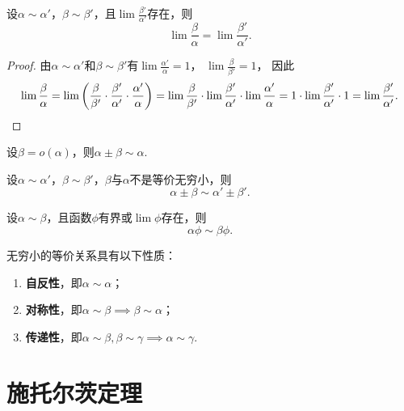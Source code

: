 \begin{theorem}\label{theorem:极限.无穷小的比较2}
设\(\alpha\sim\alpha'\)，\(\beta\sim\beta'\)，且\(\lim\frac{\beta'}{\alpha'}\)存在，则\[
	\lim\frac{\beta}{\alpha}=\lim\frac{\beta'}{\alpha'}.
\]
\begin{proof}
由\(\alpha\sim\alpha'\)和\(\beta\sim\beta'\)有\(\lim\frac{\alpha'}{\alpha} = 1\)，
\(\lim\frac{\beta}{\beta'} = 1\)，
因此\[
	\lim\frac{\beta}{\alpha}
	= \lim \left(
		\frac{\beta}{\beta'}
		\cdot \frac{\beta'}{\alpha'}
		\cdot \frac{\alpha'}{\alpha}
	\right)
	= \lim\frac{\beta}{\beta'}
		\cdot \lim \frac{\beta'}{\alpha'}
		\cdot \lim\frac{\alpha'}{\alpha}
	= 1 \cdot \lim \frac{\beta'}{\alpha'} \cdot 1
	= \lim \frac{\beta'}{\alpha'}.
	\qedhere
\]
\end{proof}
\end{theorem}

\begin{theorem}[和差取大规则]\label{theorem:极限.无穷小的比较3}
设\(\beta=o(\alpha)\)，则\(\alpha\pm\beta\sim\alpha\).
\end{theorem}

\begin{theorem}[和差代替规则]\label{theorem:极限.无穷小的比较4}
设\(\alpha\sim\alpha'\)，\(\beta\sim\beta'\)，\(\beta\)与\(\alpha\)不是等价无穷小，则\[
	\alpha\pm\beta\sim\alpha'\pm\beta'.
\]
\end{theorem}

\begin{theorem}[因式代替规则]\label{theorem:极限.无穷小的比较5}
设\(\alpha\sim\beta\)，且函数\(\phi\)有界或\(\lim\phi\)存在，则\[
	\alpha \phi \sim \beta \phi.
\]
\end{theorem}

\begin{property}\label{theorem:极限.无穷小的比较6}
无穷小的等价关系具有以下性质：
\begin{enumerate}
\item {\bf 自反性}，即\(\alpha \sim \alpha\)；
\item {\bf 对称性}，即\(\alpha \sim \beta \implies \beta \sim \alpha\)；
\item {\bf 传递性}，即\(\alpha \sim \beta, \beta \sim \gamma \implies \alpha \sim \gamma\).
\end{enumerate}
\end{property}

\section{施托尔茨定理}

